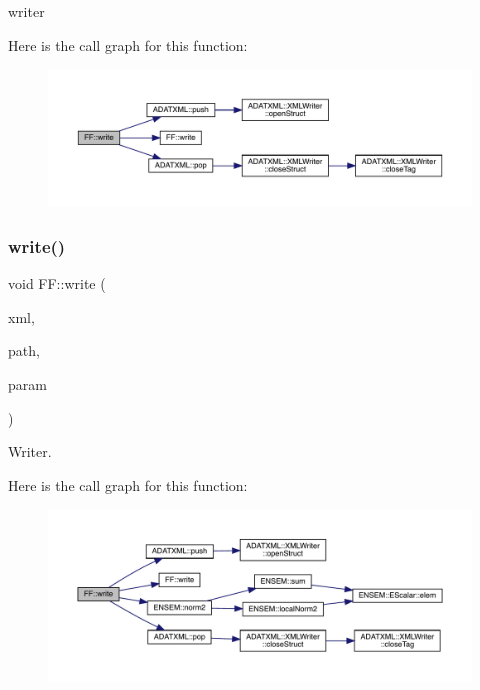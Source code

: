 writer 

Here is the call graph for this function\+:
\nopagebreak
\begin{figure}[H]
\begin{center}
\leavevmode
\includegraphics[width=350pt]{d5/da6/namespaceFF_a941e3f6fd9d8acd3d0c6b1f03c4be71b_cgraph}
\end{center}
\end{figure}
\mbox{\label{namespaceFF_a5f456c76a7fdfa1dd9305ebda8793354}} 
\subsubsection{\texorpdfstring{write()}{write()}\hspace{0.1cm}{\footnotesize\ttfamily [3/13]}}
{\footnotesize\ttfamily void F\+F\+::write (\begin{DoxyParamCaption}\item[{X\+M\+L\+Writer \&}]{xml,  }\item[{const std\+::string \&}]{path,  }\item[{const \mbox{\hyperlink{structFF_1_1PiPf}{Pi\+Pf}} \&}]{param }\end{DoxyParamCaption})}



Writer. 

Here is the call graph for this function\+:
\nopagebreak
\begin{figure}[H]
\begin{center}
\leavevmode
\includegraphics[width=350pt]{d5/da6/namespaceFF_a5f456c76a7fdfa1dd9305ebda8793354_cgraph}
\end{center}
\end{figure}
\mbox{\label{namespaceFF_ab36d46cd7c78477e7dcc2679d6cadd26}} 
